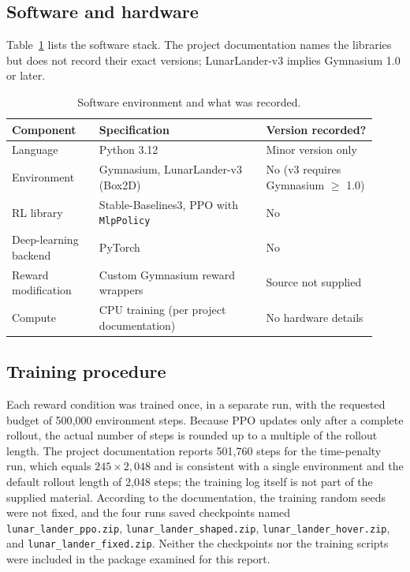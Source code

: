 \documentclass[11pt,a4paper]{article}
\begin{document}
\subsection{Software and hardware}

Table~\ref{tab:stack} lists the software stack. The project documentation names the libraries but does not record their exact versions; LunarLander-v3 implies Gymnasium 1.0 or later.

\begin{table}[!htb]
\caption[Software environment]{Software environment and what was recorded.}\label{tab:stack}
\centering\small
\begin{tabular}{@{}p{0.22\linewidth}p{0.42\linewidth}p{0.28\linewidth}@{}}
\toprule
Component & Specification & Version recorded? \\
\midrule
Language & Python 3.12 & Minor version only \\
Environment & Gymnasium, LunarLander-v3 (Box2D) & No (v3 requires Gymnasium $\geq$ 1.0) \\
RL library & Stable-Baselines3, PPO with \texttt{MlpPolicy} & No \\
Deep-learning backend & PyTorch & No \\
Reward modification & Custom Gymnasium reward wrappers & Source not supplied \\
Compute & CPU training (per project documentation) & No hardware details \\
\bottomrule
\end{tabular}
\end{table}

\subsection{Training procedure}

Each reward condition was trained once, in a separate run, with the requested budget of 500{,}000 environment steps. Because PPO updates only after a complete rollout, the actual number of steps is rounded up to a multiple of the rollout length. The project documentation reports 501{,}760 steps for the time-penalty run, which equals $245\times2{,}048$ and is consistent with a single environment and the default rollout length of 2{,}048 steps; the training log itself is not part of the supplied material. According to the documentation, the training random seeds were not fixed, and the four runs saved checkpoints named \texttt{lunar\_lander\_ppo.zip}, \texttt{lunar\_lander\_shaped.zip}, \texttt{lunar\_lander\_hover.zip}, and \texttt{lunar\_lander\_fixed.zip}. Neither the checkpoints nor the training scripts were included in the package examined for this report.
\end{document}
